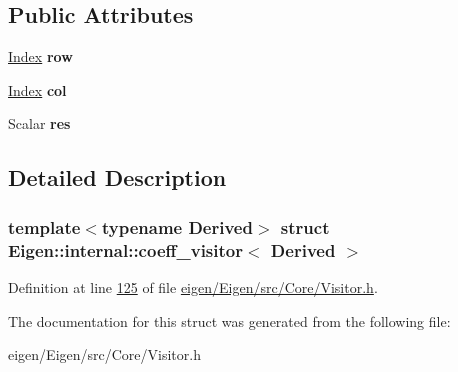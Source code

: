 \subsection*{Public Attributes}
\begin{DoxyCompactItemize}
\item 
\mbox{\label{struct_eigen_1_1internal_1_1coeff__visitor_aaec19026273c975a85b1d539d4b7dbab}} 
\hyperlink{namespace_eigen_a62e77e0933482dafde8fe197d9a2cfde}{Index} {\bfseries row}
\item 
\mbox{\label{struct_eigen_1_1internal_1_1coeff__visitor_a9ce5b71bd59199535b78b1db63fd3801}} 
\hyperlink{namespace_eigen_a62e77e0933482dafde8fe197d9a2cfde}{Index} {\bfseries col}
\item 
\mbox{\label{struct_eigen_1_1internal_1_1coeff__visitor_a997d67dffc3b7f525c5c43d6b8b61177}} 
Scalar {\bfseries res}
\end{DoxyCompactItemize}


\subsection{Detailed Description}
\subsubsection*{template$<$typename Derived$>$\newline
struct Eigen\+::internal\+::coeff\+\_\+visitor$<$ Derived $>$}



Definition at line \hyperlink{eigen_2_eigen_2src_2_core_2_visitor_8h_source_l00125}{125} of file \hyperlink{eigen_2_eigen_2src_2_core_2_visitor_8h_source}{eigen/\+Eigen/src/\+Core/\+Visitor.\+h}.



The documentation for this struct was generated from the following file\+:\begin{DoxyCompactItemize}
\item 
eigen/\+Eigen/src/\+Core/\+Visitor.\+h\end{DoxyCompactItemize}
